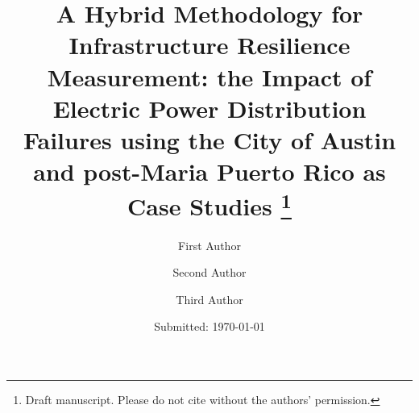 
  \title{\vspace{-15mm}\fontsize{21pt}{10pt}\selectfont\textbf{A
      Hybrid Methodology for Infrastructure Resilience Measurement:
      the Impact of Electric Power Distribution Failures using the
      City of Austin and post-Maria Puerto Rico as Case Studies
      \thanks{Draft manuscript. Please do not cite 
        without the authors' permission.}}} 

  \author[1]{\large First Author}
  \author[1]{\large Second Author}
  \author[2]{\large Third Author}
  \renewcommand\Authands{ and }

	\date{Submitted: \usvardate\today}
